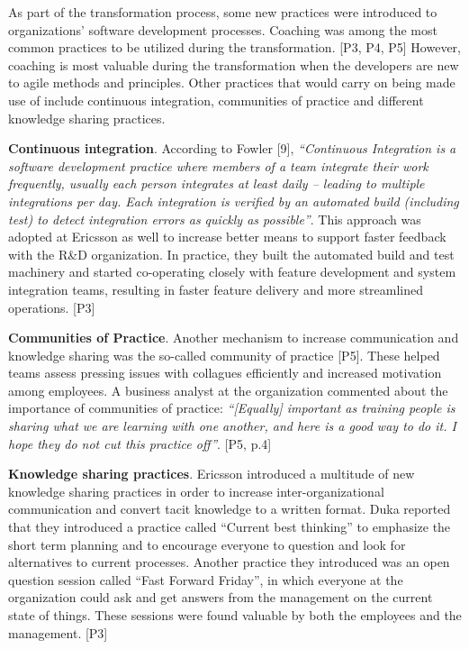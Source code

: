 As part of the transformation process, some new practices were
introduced to organizations' software development processes. Coaching
was among the most common practices to be utilized during the
transformation. [P3, P4, P5] However, coaching is most valuable during
the transformation when the developers are new to agile methods and
principles. Other practices that would carry on being made use of
include continuous integration, communities of practice and different
knowledge sharing practices.

{\bfseries Continuous integration}. According to Fowler [9],
\textit{``Continuous Integration is a software development practice
where members of a team integrate their work frequently, usually each
person integrates at least daily – leading to multiple integrations
per day. Each integration is verified by an automated build (including
test) to detect integration errors as quickly as possible''}. This
approach was adopted at Ericsson as well to increase better means to
support faster feedback with the R\&D organization. In practice, they
built the automated build and test machinery and started co-operating
closely with feature development and system integration teams, resulting
in faster feature delivery and more streamlined operations. [P3]

{\bfseries Communities of Practice}. Another mechanism to increase
communication and knowledge sharing was the so-called community of
practice [P5]. These helped teams assess pressing issues with collagues
efficiently and increased motivation among employees. A business analyst
at the organization commented about the importance of communities of
practice: \textit{``[Equally] important as training people is sharing
what we are learning with one another, and here is a good way to do it.
I hope they do not cut this practice off''}. [P5, p.4]

{\bfseries Knowledge sharing practices}. Ericsson introduced a
multitude of new knowledge sharing practices in order to increase
inter-organizational communication and convert tacit knowledge to a
written format. Duka reported that they introduced a practice called
``Current best thinking'' to emphasize the short term planning and to
encourage everyone to question and look for alternatives to current
processes. Another practice they introduced was an open question session
called ``Fast Forward Friday'', in which everyone at the organization
could ask and get answers from the management on the current state of
things. These sessions were found valuable by both the employees and the
management. [P3]
